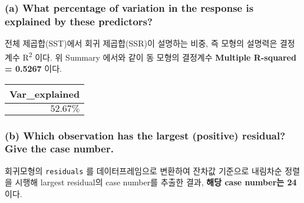 \documentclass[
]{article}
\newenvironment{Shaded}{\begin{snugshade}}{\end{snugshade}}
\newcommand{\DataTypeTok}[1]{\textcolor[rgb]{0.13,0.29,0.53}{#1}}
\newcommand{\DecValTok}[1]{\textcolor[rgb]{0.00,0.00,0.81}{#1}}
\newcommand{\KeywordTok}[1]{\textcolor[rgb]{0.13,0.29,0.53}{\textbf{#1}}}
\newcommand{\NormalTok}[1]{#1}
\newcommand{\OperatorTok}[1]{\textcolor[rgb]{0.81,0.36,0.00}{\textbf{#1}}}
\newcommand{\StringTok}[1]{\textcolor[rgb]{0.31,0.60,0.02}{#1}}
\begin{document}
\hypertarget{a-what-percentage-of-variation-in-the-response-is-explained-by-these-predictors}{%
\subsubsection{(a) What percentage of variation in the response is
explained by these
predictors?}\label{a-what-percentage-of-variation-in-the-response-is-explained-by-these-predictors}}

전체 제곱합(SST)에서 회귀 제곱합(SSR)이 설명하는 비중, 즉 모형의
설명력은 결정 계수 R\textsuperscript{2} 이다. 위 Summary 에서와 같이 동
모형의 결정계수 \textbf{Multiple R-squared = 0.5267} 이다.

\begin{Shaded}
\end{Shaded}

\captionsetup[table]{labelformat=empty,skip=1pt}
\begin{longtable}{r}
\toprule
Var\_explained \\ 
\midrule
$52.67\%$ \\ 
\bottomrule
\end{longtable}

\hypertarget{b-which-observation-has-the-largest-positive-residual-give-the-case-number.}{%
\subsubsection{(b) Which observation has the largest (positive)
residual? Give the case
number.}\label{b-which-observation-has-the-largest-positive-residual-give-the-case-number.}}

회귀모형의 \texttt{residuals} 를 데이터프레임으로 변환하여 잔차값
기준으로 내림차순 정렬을 시행해 largest residual의 case number를 추출한
결과, \textbf{해당 case number는 24} 이다.

\begin{Shaded}
\end{Shaded}
\end{document}

